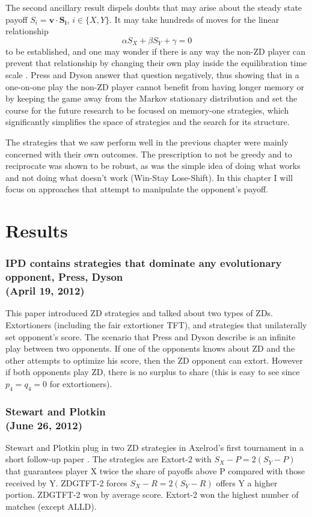The second ancillary result dispels doubts that may arise about the steady state payoff $S_i = \mathbf{v}\cdot \mathbf{S_i}$, $i \in \{X, Y\}$. It may take hundreds of moves for the linear relationship
\[
\alpha S_X + \beta S_Y + \gamma = 0
\]
to be established, and one may wonder if there is any way the non-ZD player can prevent that relationship by changing their own play inside the equilibration time scale . Press and Dyson answer that question negatively, thus showing that in a one-on-one play the non-ZD player cannot benefit from having longer memory or by keeping the game away from the Markov stationary distribution and set the course for the future research to be focused on memory-one strategies, which significantly simplifies the space of strategies and the search for its structure.




The strategies that we saw perform well in the previous chapter were mainly concerned with their own outcomes. The prescription to not be greedy and to reciprocate was shown to be robust, as was the simple idea of doing what works and not doing what doesn't work (Win-Stay Lose-Shift). In this chapter I will focus on approaches that attempt to manipulate the opponent's payoff. 

\section{Results}

\subsubsection{IPD contains strategies that dominate any evolutionary opponent, Press, Dyson \cite{Press26062012}
\\(April 19, 2012)}
This paper introduced ZD strategies and talked about two types of ZDs. Extortioners (including the fair extortioner TFT), and strategies that unilaterally set opponent's score. The scenario that Press and Dyson describe is an infinite play between two opponents. If one of the opponents knows about ZD and the other attempts to optimize his score, then the ZD opponent can extort. However if both opponents play ZD, there is no surplus to share (this is easy to see since $p_4 = q_4 = 0$ for extortioners). 


\subsubsection{Stewart and Plotkin \cite{Stewart26062012}
\\(June 26, 2012)}
Stewart and Plotkin plug in two ZD strategies in Axelrod's first tournament in a short follow-up paper \cite{Stewart26062012}. The strategies are Extort-2 with $S_X - P = 2(S_Y - P)$ that guarantees player X twice the share of payoffs above P compared with those received by Y. ZDGTFT-2 forces $S_X - R = 2(S_Y - R)$ offers Y a higher portion. ZDGTFT-2 won by average score. Extort-2 won the highest number of matches (except ALLD).

